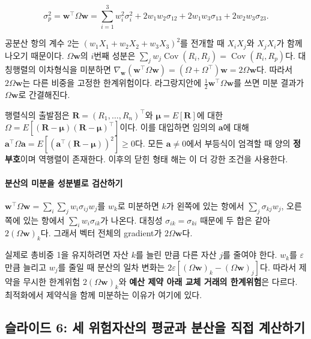 \documentclass[11pt,a4paper]{article}
\begin{document}
\[
\sigma_p^2=\mathbf w^\top\Omega\mathbf w
=\sum_{i=1}^3w_i^2\sigma_i^2
+2w_1w_2\sigma_{12}+2w_1w_3\sigma_{13}+2w_2w_3\sigma_{23}.
\]

공분산 항의 계수 2는 $(w_1X_1+w_2X_2+w_3X_3)^2$를 전개할 때 $X_iX_j$와 $X_jX_i$가 함께 나오기 때문이다. $\Omega\mathbf w$의 $i$번째 성분은 $\sum_jw_j\operatorname{Cov}(R_i,R_j)=\operatorname{Cov}(R_i,R_p)$다. 대칭행렬의 이차형식을 미분하면 $\nabla_{\mathbf w}(\mathbf w^\top\Omega\mathbf w)=(\Omega+\Omega^\top)\mathbf w=2\Omega\mathbf w$다. 따라서 $2\Omega\mathbf w$는 다른 비중을 고정한 한계위험이다. 라그랑지안에 $\tfrac12\mathbf w^\top\Omega\mathbf w$를 쓰면 미분 결과가 $\Omega\mathbf w$로 간결해진다.
\par

행렬식의 출발점은 $\mathbf R=(R_1,\ldots,R_n)^\top$와 $\boldsymbol\mu=E[\mathbf R]$에 대한 $\Omega=E[(\mathbf R-\boldsymbol\mu)(\mathbf R-\boldsymbol\mu)^\top]$이다. 이를 대입하면 임의의 $\mathbf a$에 대해 $\mathbf a^\top\Omega\mathbf a=E[(\mathbf a^\top(\mathbf R-\boldsymbol\mu))^2]\ge0$다. 모든 $\mathbf a\ne0$에서 부등식이 엄격할 때 양의 \textbf{정부호}이며 역행렬이 존재한다. 이후의 닫힌 형태 해는 이 더 강한 조건을 사용한다.
\par

\paragraph{분산의 미분을 성분별로 검산하기}

$\mathbf w^\top\Omega\mathbf w=\sum_i\sum_j w_i\sigma_{ij}w_j$를 $w_k$로 미분하면 $k$가 왼쪽에 있는 항에서 $\sum_j\sigma_{kj}w_j$, 오른쪽에 있는 항에서 $\sum_iw_i\sigma_{ik}$가 나온다. 대칭성 $\sigma_{ik}=\sigma_{ki}$ 때문에 두 합은 같아 $2(\Omega\mathbf w)_k$다. 그래서 벡터 전체의 gradient가 $2\Omega\mathbf w$다.
\par

실제로 총비중 1을 유지하려면 자산 $k$를 늘린 만큼 다른 자산 $j$를 줄여야 한다. $w_k$를 $\varepsilon$만큼 늘리고 $w_j$를 줄일 때 분산의 일차 변화는 $2\varepsilon[(\Omega\mathbf w)_k-(\Omega\mathbf w)_j]$다. 따라서 제약을 무시한 한계위험 $2(\Omega\mathbf w)_k$와 \textbf{예산 제약 아래 교체 거래의 한계위험}은 다르다. 최적화에서 제약식을 함께 미분하는 이유가 여기에 있다.
\par

\subsection{슬라이드 6: 세 위험자산의 평균과 분산을 직접 계산하기}
\end{document}
